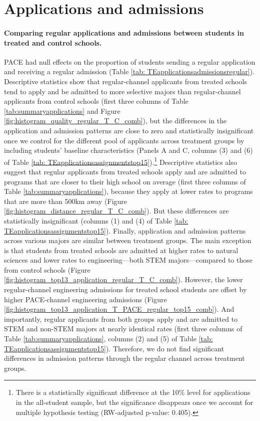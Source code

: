 \section{Applications and admissions}
	\setcounter{table}{0}
	\renewcommand{\thetable}{F\arabic{table}}
	
	\setcounter{figure}{0}
	\renewcommand{\thefigure}{F\arabic{figure}}
\label{application_lists}
\paragraph{Comparing regular applications and admissions between students in treated and control schools.} PACE had null effects on the proportion of students sending a regular application and receiving a regular admission (Table \ref{tab: TEapplicationsadmissionsregular}). Descriptive statistics show that regular-channel applicants from treated schools tend to apply and be admitted to more selective majors than regular-channel applicants from control schools (first three columns of Table \ref{tab:summaryapplications} and Figure \ref{fig:histogram_quality_regular_T_C_comb}), but the differences in the application and admission patterns are close to zero and statistically insignificant once we control for the different pool of applicants across treatment groups by including students' baseline characteristics (Panels A and C, columns (3) and (6) of Table \ref{tab: TEapplicationsassignmentstop15}).\footnote{There is a statistically significant difference at the 10\% level for applications in the all-student sample, but the significance disappears once we account for multiple hypothesis testing (RW-adjusted p-value: 0.405). } Descriptive statistics also suggest that regular applicants from treated schools apply and are admitted to programs that are closer to their high school on average (first three columns of Table \ref{tab:summaryapplications}), because they apply at lower rates to programs that are more than 500km away (Figure \ref{fig:histogram_distance_regular_T_C_comb}). But these differences are statistically insignificant (columns (1) and (4) of Table \ref{tab: TEapplicationsassignmentstop15}). Finally, application and admission patterns across various majors are similar between treatment groups. The main exception is that students from treated schools are admitted at higher rates to natural sciences and lower rates to engineering---both STEM majors---compared to those from control schools (Figure \ref{fig:histogram_top13_application_regular_T_C_comb}). However, the lower regular-channel engineering admissions for treated school students are offset by higher PACE-channel engineering admissions (Figure \ref{fig:histogram_top13_application_T_PACE_regular_top15_comb}). And importantly, regular applicants from both groups apply and are admitted to STEM and non-STEM majors at nearly identical rates (first three columns of Table \ref{tab:summaryapplications}, columns (2) and (5) of Table \ref{tab: TEapplicationsassignmentstop15}). Therefore, we do not find significant differences in admission patterns through the regular channel across treatment groups.\par 
            

